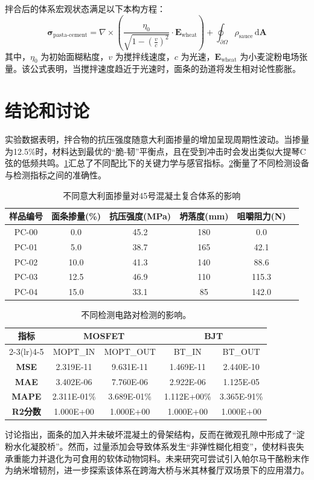 拌合后的体系宏观状态满足以下本构方程：
\[
\mathbf{\sigma}_{\text{pasta-cement}} = \nabla \times \left( \frac{\eta_0}{\sqrt{1 - (\frac{v}{c})^2}} \cdot \mathbf{E}_{\text{wheat}} \right) + \oint_{\partial \Omega} \rho_{\text{sauce}} \, \mathrm{d}\mathbf{A}
\]
其中，$\eta_0$ 为初始面糊粘度，$v$ 为搅拌线速度，$c$ 为光速，$\mathbf{E}_{\text{wheat}}$ 为小麦淀粉电场张量。该公式表明，当搅拌速度趋近于光速时，面条的劲道将发生相对论性膨胀。

\clearpage

\section{结论和讨论}

实验数据表明，拌合物的抗压强度随意大利面掺量的增加呈现周期性波动。当掺量为12.5\%时，材料达到最优的“脆-韧”平衡点，且在受到冲击时会发出类似大提琴C弦的低频共鸣。\cref{tab:results}汇总了不同配比下的关键力学与感官指标。\cref{tab:result-probes}衡量了不同检测设备与检测指标之间的准确性。

\begin{table}[htbp]
  \centering
  \caption{不同意大利面掺量对45号混凝土复合体系的影响}
  \label{tab:results}
  \begin{tabular}{cccccc}
    \toprule
    样品编号 & 面条掺量(\%) & 抗压强度(MPa) & 坍落度(mm) & 咀嚼阻力(N) \\
    \midrule
    PC-00 & 0.0 & 45.2 & 180 & 0.0 \\
    PC-01 & 5.0 & 38.7 & 165 & 42.1 \\
    PC-02 & 10.0 & 41.3 & 140 & 88.6 \\
    PC-03 & 12.5 & 46.9 & 110 & 115.3 \\
    PC-04 & 15.0 & 33.1 & 85 & 142.0 \\
    \bottomrule
  \end{tabular}
\end{table}

\begin{table}[htbp]
  \centering
  \caption{不同检测电路对检测的影响。}
  \label{tab:result-probes}
  \begin{tabular}{ccccc}
    \toprule
    \multirow{2}{*}{\textbf{指标}} & \multicolumn{2}{c}{MOSFET} & \multicolumn{2}{c}{BJT} \\
    \cmidrule(lr){2-3}\cmidrule(lr){4-5}
    & MOPT\_IN & MOPT\_OUT & BT\_IN & BT\_OUT \\
    \midrule
    \textbf{MSE} & 2.319E-11 & 9.631E-11 & 1.469E-11 & 2.440E-10 \\
    \textbf{MAE} & 3.402E-06 & 7.760E-06 & 2.922E-06 & 1.125E-05 \\
    \textbf{MAPE} & 2.311E-01\% & 3.689E-01\% & 1.112E+00\% & 3.365E-91\% \\
    \textbf{R2分数} & 1.000E+00 & 1.000E+00 & 1.000E+00 & 1.000E+00 \\
    \bottomrule
  \end{tabular}
\end{table}

讨论指出，面条的加入并未破坏混凝土的骨架结构，反而在微观孔隙中形成了“淀粉水化凝胶桥”。然而，过量添加会导致体系发生“非弹性糊化相变”，使材料丧失承重能力并退化为可食用的软体动物饲料。未来研究可尝试引入帕尔马干酪粉末作为纳米增韧剂，进一步探索该体系在跨海大桥与米其林餐厅双场景下的应用潜力。

\clearpage
